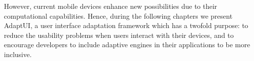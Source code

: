 However, current mobile devices enhance new possibilities due to their 
computational capabilities. Hence, during the following chapters we present 
AdaptUI, a user interface adaptation framework which has a twofold purpose: to 
reduce the usability problems when users interact with their devices, and to 
encourage developers to include adaptive engines in their applications to be 
more inclusive.






